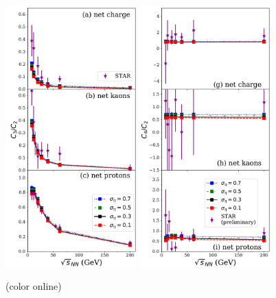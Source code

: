 \begin{figure}
\centerline{\includegraphics[width=0.45\textwidth]{figs/bw_skewness_sigmaeta}\hspace{0.06\textwidth}
\includegraphics[width=0.45\textwidth]{figs/bw_kurtosis_sigmaeta}}
\caption{\label{fig:bw_vs_sigmaeta} (color online)  }
\end{figure}

